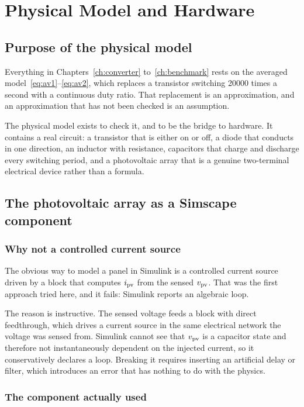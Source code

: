\chapter{Physical Model and Hardware}
\label{ch:physical}

\section{Purpose of the physical model}

Everything in Chapters~\ref{ch:converter} to~\ref{ch:benchmark} rests on the
averaged model~\eqref{eq:av1}--\eqref{eq:av2}, which replaces a transistor
switching \num{20000} times a second with a continuous duty ratio. That
replacement is an approximation, and an approximation that has not been checked
is an assumption.

The physical model exists to check it, and to be the bridge to hardware. It
contains a real circuit: a transistor that is either on or off, a diode that
conducts in one direction, an inductor with resistance, capacitors that charge
and discharge every switching period, and a photovoltaic array that is a genuine
two-terminal electrical device rather than a formula.

\section{The photovoltaic array as a Simscape component}

\subsection{Why not a controlled current source}

The obvious way to model a panel in Simulink is a controlled current source
driven by a block that computes $i_{\mathrm{pv}}$ from the sensed $v_{\mathrm{pv}}$. That was the
first approach tried here, and it fails: Simulink reports an algebraic loop.

The reason is instructive. The sensed voltage feeds a block with direct
feedthrough, which drives a current source in the same electrical network the
voltage was sensed from. Simulink cannot see that $v_{\mathrm{pv}}$ is a capacitor state
and therefore not instantaneously dependent on the injected current, so it
conservatively declares a loop. Breaking it requires inserting an artificial
delay or filter, which introduces an error that has nothing to do with the
physics.

\subsection{The component actually used}

